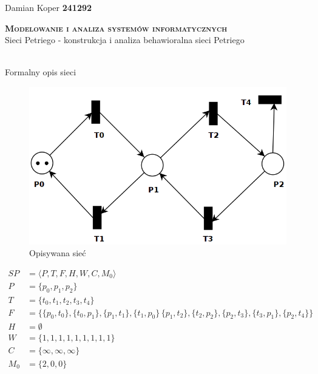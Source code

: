 \documentclass[12pt]{article}
\begin{document}
\begin{flushleft}
    Damian Koper \textbf{241292} \\
\end{flushleft}
\vspace{1cm}
{
    \centering
    {\Huge\scshape\bfseries Modelowanie i analiza systemów informatycznych }\\
    \large{Sieci Petriego - konstrukcja i analiza behawioralna sieci Petriego}\\
    \vspace{0.5cm}
}
\setcounter{ex}{0}
\newcommand{\ex}[1]{
     \\
    #1
}

\ex{Formalny opis sieci}
\vspace{-0.5cm}

\begin{figure}[H]
    \centering
    \includegraphics[width=0.5\linewidth]{../../lab6/ex_1}
    \caption{Opisywana sieć}
\end{figure}
\vspace{-1cm}
\begin{align*}
    SP  & = \langle{P,T,F,H,W,C,M_0}\rangle                         \\
    P   & =\{p_0, p_1, p_2\}                                        \\
    T   & =\{t_0, t_1, t_2, t_3, t_4\}                              \\
    F   & = \{\{p_0, t_0\},\{t_0, p_1\},\{p_1,t_1\},\{t_1,p_0\}\,
    \{p_1, t_2\},\{t_2, p_2\},\{p_2,t_3\},\{t_3,p_1\},\{p_2,t_4\}\} \\
    H   & = \emptyset                                               \\
    W   & = \{1,1,1,1,1,1,1,1,1\}                                   \\
    C   & = \{\infty,\infty,\infty\}                                \\
    M_0 & =\{2,0,0\}
\end{align*}
\newpage
\end{document}
